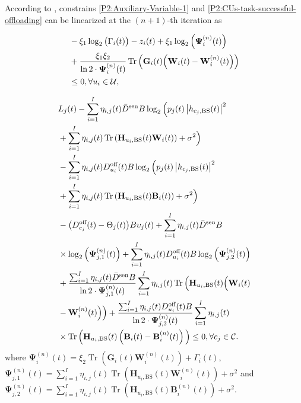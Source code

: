 \documentclass[10pt,journal,compsoc]{IEEEtran}
\begin{document}
According to \cite{Solution: Linear-log2-Tr-X}, constrains \eqref{P2:Auxiliary-Variable-1} and \eqref{P2:CUs-task-successful-offloading} can be linearized at the $(n + 1)$-th iteration as 

\begin{align}\label{CCCP:Auxiliary-Variable-1}
    & - \xi_{1}\log_{2} \big(\Gamma_{i}(t)\big) - z_{i}(t) + \xi_{1} \log_2 \Big(\bm{\Psi}_{i}^{(n)}(t)\Big) \notag \\
    & + \frac{\xi_{1} \xi_{2}}{\ln 2 \cdot \bm{\Psi}_{i}^{(n)}(t)} \operatorname{Tr}\Big(\mathbf{G}_{i}(t)\Big(\mathbf{W}_{i}(t) - \mathbf{W}_{i}^{(n)}(t)\Big)\Big) \notag \\
    & \le 0, \forall u_{i} \in \mathcal{U},
\end{align}


\begin{align}\label{CCCP:CUs-task-successful-offloading}
    & L_{j}(t) - \sum_{i = 1}^{I} \eta_{i, j}(t) \bar{D}^{\text{sen}} B \log_{2}\Big( p_{j}(t) \left|h_{c_{j}, \text{BS}}(t)\right|^{2} \notag \\
    & + \sum_{i = 1}^{I} \eta_{i, j}(t)\operatorname{Tr}\left(\mathbf{H}_{u_{i}, \text{BS}}(t)\mathbf{W}_{i}(t)\right) + \sigma^{2}\Big) \notag \\
    & - \sum_{i = 1}^{I} \eta_{i, j}(t) D_{u_{i}}^{\text{off}}(t) B \log_{2}\Big(p_{j}(t) \left|h_{c_{j}, \text{BS}}(t)\right|^{2} \notag \\
    & + \sum_{i = 1}^{I} \eta_{i, j}(t) \operatorname{Tr}\left(\mathbf{H}_{u_{i},\text{BS}}(t)\mathbf{B}_{i}(t)\right) + \sigma^{2}\Big) \notag \\
    & - \big(D_{c_{j}}^{\text{off}}(t) - \Theta_{j}(t)\big) B \upsilon_{j}(t) + \sum_{i = 1}^{I} \eta_{i, j}(t) \bar{D}^{\text{sen}} B  \notag \\
    & \times \log_{2}\left(\bm{\Psi}_{j, 1}^{(n)}(t)\right) + \sum_{i = 1}^{I} \eta_{i, j}(t)D_{u_{i}}^{\text{off}}(t) B \log_{2}\left(\bm{\Psi}_{j, 2}^{(n)}(t)\right)\notag \\
    & + \frac{\sum_{i = 1}^{I} \eta_{i, j}(t) \bar{D}^{\text{sen}}B}{\ln 2 \cdot \bm{\Psi}_{j, 1}^{(n)}(t)} \sum_{i=1}^I \eta_{i, j}(t) \operatorname{Tr}\Big( \mathbf{H}_{u_{i},\text{BS}}(t)\Big(\mathbf{W}_{i}(t) \notag \\ 
    & - \mathbf{W}_{i}^{(n)}(t)\Big) \Big) + \frac{\sum_{i = 1}^{I} \eta_{i, j}(t)D_{u_{i}}^{\text{off}}(t) B}{\ln 2 \cdot \bm{\Psi}_{j, 2}^{(n)}(t)} \sum_{i=1}^I \eta_{i, j}(t) \notag \\
    & \times \operatorname{Tr}\Big( \mathbf{H}_{u_{i},\text{BS}}(t)\left(\mathbf{B}_{i}(t) - \mathbf{B}_{i}^{(n)}(t)\right) \Big) \le 0, \forall c_{j} \in \mathcal{C}.
\end{align}
where $\bm{\Psi}_{i}^{(n)}(t) = \xi_{2}\operatorname{Tr}\left(\mathbf{G}_{i}(t)\mathbf{W}^{(n)}_{i}(t)\right) + \Gamma_{i}(t)$, 
$\bm{\Psi}_{j, 1}^{(n)}(t) = \sum_{i = 1}^{I} \eta_{i, j}(t) \operatorname{Tr}\left(\mathbf{H}_{u_{i},\text{BS}}(t)\mathbf{W}^{(n)}_{i}(t)\right) + \sigma^{2}$ and
$\bm{\Psi}_{j, 2}^{(n)}(t) = \sum_{i = 1}^{I} \eta_{i, j}(t) \operatorname{Tr}\left(\mathbf{H}_{u_{i},\text{BS}}(t)\mathbf{B}^{(n)}_{i}(t)\right) + \sigma^{2}$.
\end{document}
